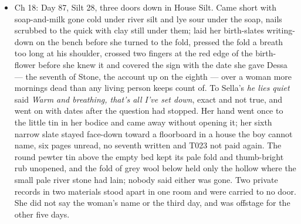 \documentclass{design/chronicle}
\begin{document}
{\begin{itemize}[leftmargin=1.4em,itemsep=1pt,topsep=3pt,parsep=0pt]
\end{itemize}

\begin{itemize}[leftmargin=1.4em,itemsep=1pt,topsep=3pt,parsep=0pt]

\item Ch 18: Day 87, Silt 28, three doors down in House Silt. Came short with soap-and-milk gone cold under river silt and lye sour under the soap, nails scrubbed to the quick with clay still under them; laid her birth-slates writing-down on the bench before she turned to the fold, pressed the fold a breath too long at his shoulder, crossed two fingers at the red edge of the birth-flower before she knew it and covered the sign with the date she gave Dessa --- the seventh of Stone, the account up on the eighth --- over a woman more mornings dead than any living person keeps count of. To Sella’s \emph{he lies quiet} said \emph{Warm and breathing, that’s all I’ve set down}, exact and not true, and went on with dates after the question had stopped. Her hand went once to the little tin in her bodice and came away without opening it; her sixth narrow slate stayed face-down toward a floorboard in a house the boy cannot name, six pages unread, no seventh written and T023 not paid again. The round pewter tin above the empty bed kept its pale fold and thumb-bright rub unopened, and the fold of grey wool below held only the hollow where the small pale river stone had lain; nobody said either was gone. Two private records in two materials stood apart in one room and were carried to no door. She did not say the woman’s name or the third day, and was offstage for the other five days.

\end{itemize}

\begin{itemize}[leftmargin=1.4em,itemsep=1pt,topsep=3pt,parsep=0pt]


\end{itemize}}
\end{document}
